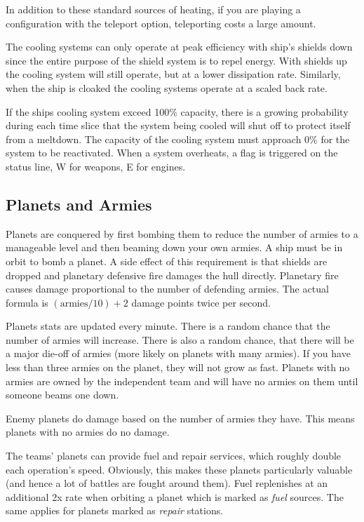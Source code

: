 In addition to these standard sources of heating, if you are playing a
configuration with the teleport option, teleporting costs a large
amount.

The cooling systems can only operate at peak efficiency with ship's
shields down since the entire purpose of the shield system is to repel
energy. With shields up the cooling system will still operate, but at a
lower dissipation rate. Similarly, when the ship is cloaked the cooling
systems operate at a scaled back rate.

If the ships cooling system exceed 100\% capacity, there is a growing
probability during each time slice that the system being cooled will
shut off to protect itself from a meltdown. The capacity of the
cooling system must approach 0\% for the system to be reactivated. When
a system overheats, a flag is triggered on the status line, W for weapons,
E for engines.

\subsection{Planets and Armies}

Planets are conquered by first bombing them to reduce the number of
armies to a manageable level and then beaming down your own armies.  A
ship must be in orbit to bomb a planet.  A side effect of this
requirement is that shields are dropped and planetary defensive fire
damages the hull directly.  Planetary fire causes damage proportional
to the number of defending armies.  The actual formula is
$(\mbox{armies}/ 10) + 2$ damage points twice per second.

Planets stats are updated every minute.  There is a random chance that the
number of armies will increase.  There is also a random chance, that
there will be a major die-off of armies (more likely on planets with many armies).
If you have less than three armies
on the planet, they will not grow as fast.  Planets with no armies are
owned by the independent team and will have no armies on them until
someone beams one down.

Enemy planets do damage based on the number of armies they have.
This means planets with no armies do no damage.  

The teams' planets can provide
fuel and repair services, which roughly double each operation's speed.  
Obviously, this makes these planets
particularly valuable (and hence a lot of battles are fought around them).
Fuel replenishes at an additional 2x rate when orbiting a planet which is 
marked as {\em fuel} sources. The same applies for planets marked as {\em repair}
stations.


